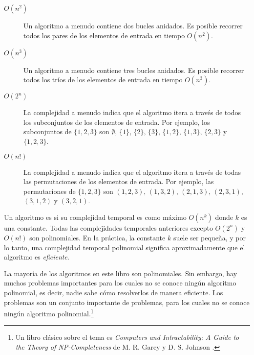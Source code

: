 \begin{description}
    \item[$O(n^2)$]
          Un algoritmo  a menudo contiene
          dos bucles anidados.
          Es posible recorrer todos los pares de
          los elementos de entrada en tiempo $O(n^2)$.

    \item[$O(n^3)$]
          Un algoritmo  a menudo contiene
          tres bucles anidados.
          Es posible recorrer todos los tríos de
          los elementos de entrada en tiempo $O(n^3)$.

    \item[$O(2^n)$]
          La complejidad  a menudo indica que
          el algoritmo itera a través de todos
          los subconjuntos de los elementos de entrada.
          Por ejemplo, los subconjuntos de $\{1,2,3\}$ son
          $\emptyset$, $\{1\}$, $\{2\}$, $\{3\}$, $\{1,2\}$,
          $\{1,3\}$, $\{2,3\}$ y $\{1,2,3\}$.

    \item[$O(n!)$]
          La complejidad  a menudo indica que
          el algoritmo itera a través de todas
          las permutaciones de los elementos de entrada.
          Por ejemplo, las permutaciones de $\{1,2,3\}$ son
          $(1,2,3)$, $(1,3,2)$, $(2,1,3)$, $(2,3,1)$,
          $(3,1,2)$ y $(3,2,1)$.

\end{description}

Un algoritmo es 
si su complejidad temporal es como máximo $O(n^k)$
donde $k$ es una constante.
Todas las complejidades temporales anteriores excepto
$O(2^n)$ y $O(n!)$ son polinomiales.
En la práctica, la constante $k$ suele ser pequeña,
y por lo tanto, una complejidad temporal polinomial
significa aproximadamente que el algoritmo es \emph{eficiente}.


La mayoría de los algoritmos en este libro son polinomiales.
Sin embargo, hay muchos problemas importantes para los cuales
no se conoce ningún algoritmo polinomial, es decir,
nadie sabe cómo resolverlos de manera eficiente.
Los problemas  son un conjunto importante
de problemas, para los cuales no se conoce ningún algoritmo
polinomial.\footnote{Un libro clásico sobre el tema es
    \emph{Computers and Intractability: A Guide to the Theory
        of NP-Completeness} de M. R. Garey y D. S. Johnson \cite{gar79}.}

